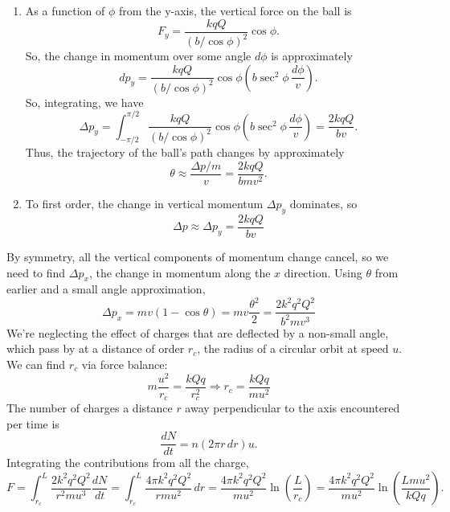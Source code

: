 \documentclass[11pt]{scrartcl}
\begin{document}
\begin{alphasol}
    \item \begin{enumerate}[label=(\roman*)] \item As a function of $\phi$ from the y-axis, the vertical force on the ball is
    $$F_y = \frac{kqQ}{(b/\cos \phi)^2} \cos \phi.$$
    So, the change in momentum over some angle $d\phi$ is approximately
    $$dp_y = \frac{kqQ}{(b/\cos \phi)^2}\cos \phi \left(b \sec^2 \phi \, \frac{d\phi}v\right).$$
    So, integrating, we have
    $$\Delta p_y = \int_{-\pi/2}^{\pi/2} \frac{kqQ}{(b/\cos \phi)^2}\cos \phi \left(b \sec^2 \phi \, \frac{d\phi}v\right) = \frac{2kqQ}{bv}.$$
    Thus, the trajectory of the ball's path changes by approximately
    $$\theta \approx \frac{\Delta p / m}{v} = \boxed{\frac{2kqQ}{bmv^2}}.$$
    \item To first order, the change in vertical momentum $\Delta p_y$ dominates, so $$\Delta p\approx \Delta p_y=\boxed{\frac{2kqQ}{bv}}$$
    \end{enumerate}
    \item 
        By symmetry, all the vertical components of momentum change cancel, so we need to find $\Delta p_x$, the change in momentum along the $x$ direction. Using $\theta$ from earlier and a small angle approximation, $$\Delta p_x=mv\left(1-\cos\theta\right)=mv\frac{\theta^2}{2}=\frac{2k^2q^2Q^2}{b^2mv^3}$$ We're neglecting the effect of charges that are deflected by a non-small angle, which pass by at a distance of order $r_c$, the radius of a circular orbit at speed $u$. We can find $r_c$ via force balance: $$m\frac{u^2}{r_c}=\frac{kQq}{r_c^2}\Rightarrow r_c=\frac{kQq}{mu^2}$$The number of charges a distance $r$ away perpendicular to the axis encountered per time is
        $$\frac{dN}{dt} = n(2\pi r \, dr)u.$$ Integrating the contributions from all the charge,
        $$F = \int_{r_c}^L \frac{2k^2q^2Q^2}{r^2mu^3}\frac{dN}{dt} = \int_{r_c}^L \frac{4\pi k^2q^2Q^2}{rmu^2} \, dr =\frac{4\pi k^2q^2Q^2}{mu^2}\ln \left(\frac L{r_c}\right)=\boxed{\frac{4\pi k^2q^2Q^2}{mu^2}\ln \left(\frac {Lmu^2}{kQq}\right)}.$$
\end{alphasol}
\end{document}
